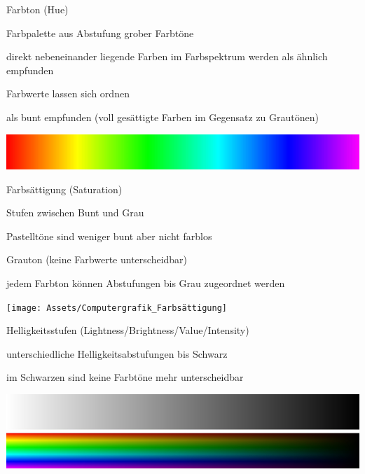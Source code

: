 \documentclass[landscape]{article}
\begin{document}
\begin{multicols}{3}
  \begin{description*}
    \item[Farbton] (Hue)
    \begin{itemize*}
      \item Farbpalette aus Abstufung grober Farbtöne 
      \item direkt nebeneinander liegende Farben im Farbspektrum werden als ähnlich empfunden
      \item Farbwerte lassen sich ordnen
      \item als bunt empfunden (voll gesättigte Farben im Gegensatz zu Grautönen)
      \begin{center}
        \includegraphics[width=.4\linewidth]{Assets/Computergrafik_Farbton}
      \end{center}
    \end{itemize*}
    \item[Farbsättigung] (Saturation)
    \begin{itemize*}
      \item Stufen zwischen Bunt und Grau
      \item Pastelltöne sind weniger bunt aber nicht farblos
      \item Grauton (keine Farbwerte unterscheidbar)
      \item jedem Farbton können Abstufungen bis Grau zugeordnet werden
      \begin{center}
        \texttt{[image: Assets/Computergrafik\_Farbsättigung]}
      \end{center}
    \end{itemize*}
    \item[Helligkeitsstufen] (Lightness/Brightness/Value/Intensity)
    \begin{itemize*}
      \item unterschiedliche Helligkeitsabstufungen bis Schwarz
      \item im Schwarzen sind keine Farbtöne mehr unterscheidbar
      \begin{center}
        \includegraphics[width=.4\linewidth]{Assets/Computergrafik_Helligkeitsstufen}
      \end{center}
    \end{itemize*}
  \end{description*}
  

\end{multicols}
\end{document}

